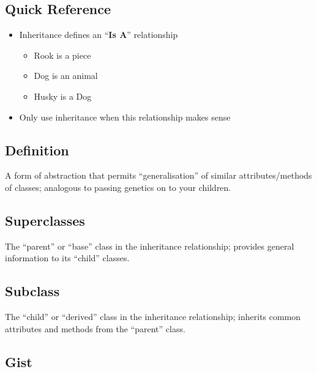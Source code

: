 \documentclass[]{article}
\providecommand{\tightlist}{%
  \setlength{\itemsep}{0pt}\setlength{\parskip}{0pt}}
\begin{document}
\hypertarget{quick-reference}{%
\subsection{Quick Reference}\label{quick-reference}}

\begin{itemize}
\tightlist
\item
  Inheritance defines an ``\textbf{Is A}'' relationship

  \begin{itemize}
  \tightlist
  \item
    Rook is a piece
  \item
    Dog is an animal
  \item
    Husky is a Dog
  \end{itemize}
\item
  Only use inheritance when this relationship makes sense
\end{itemize}

\hypertarget{definition}{%
\subsection{Definition}\label{definition}}

A form of abstraction that permits ``generalisation'' of similar
attributes/methods of classes; analogous to passing genetics on to your
children.

\hypertarget{superclasses}{%
\subsection{Superclasses}\label{superclasses}}

The ``parent'' or ``base'' class in the inheritance relationship;
provides general information to its ``child'' classes.

\hypertarget{subclass}{%
\subsection{Subclass}\label{subclass}}

The ``child'' or ``derived'' class in the inheritance relationship;
inherits common attributes and methods from the ``parent'' class.

\hypertarget{gist}{%
\subsection{Gist}\label{gist}}
\end{document}
